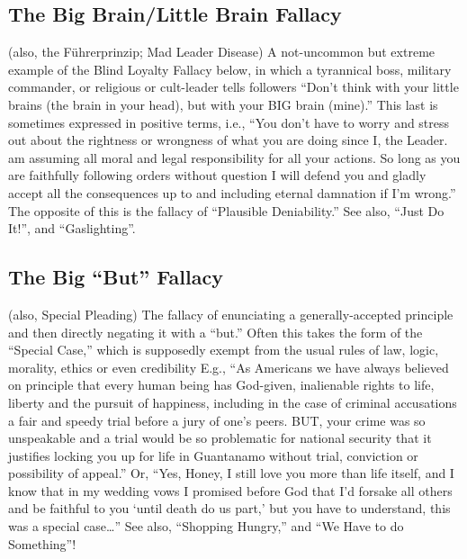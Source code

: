 \documentclass[10pt,a4paper,british]{article}
\begin{document}
\begin{multicols}{2}
    \subsection{The Big Brain/Little Brain Fallacy} (also, the Führerprinzip; Mad Leader Disease) A not{-}uncommon but extreme example of the Blind Loyalty Fallacy below, in which a tyrannical boss, military commander, or religious or cult{-}leader tells followers ``Don't think with your little brains (the brain in your head), but with your BIG brain (mine).'' This last is sometimes expressed in positive terms, i.e., ``You don't have to worry and stress out about the rightness or wrongness of what you are doing since I, the Leader. am assuming all moral and legal responsibility for all your actions. So long as you are faithfully following orders without question I will defend you and gladly accept all the consequences up to and including eternal damnation if I'm wrong.'' The opposite of this is the fallacy of ``Plausible Deniability.'' See also, ``Just Do It!'', and ``Gaslighting''.  

    \subsection{The Big ``But'' Fallacy} (also, Special Pleading)  The fallacy of enunciating a generally{-}accepted principle and then directly negating it with a ``but.'' Often this takes the form of the ``Special Case,'' which is supposedly exempt from the usual rules of law, logic, morality, ethics or even credibility  E.g., ``As Americans we have always believed on principle that every human being has God{-}given, inalienable rights to life, liberty and the pursuit of happiness, including in the case of criminal accusations a fair and speedy trial before a jury of one's peers.  BUT, your crime was so unspeakable and a trial would be so problematic for national security that it justifies locking you up for life in Guantanamo without trial, conviction or possibility of appeal.''  Or, ``Yes, Honey, I still love you more than life itself, and I know that in my wedding vows I promised before God that I'd forsake all others and be faithful to you `until death do us part,' but you have to understand, this was a special case\ldots''  See also, ``Shopping Hungry,'' and ``We Have to do Something''!  


\end{multicols}
\end{document}
